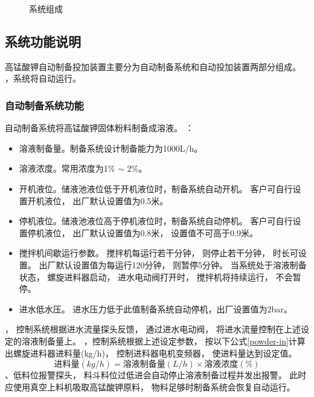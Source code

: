 \documentclass[UTF8,a4paper,12pt,titlepage]{ctexart}
\begin{document}
\begin{figure}[h]
\begin{tikzpicture}

         \end{tikzpicture}
         \caption{系统组成}\label{fig:p2}
      \end{figure}

   \subsection{系统功能说明}
      高锰酸钾自动制备投加装置主要分为自动制备系统和自动投加装置两部分组成。
      ，系统将自动运行。
      \subsubsection{自动制备系统功能}
         自动制备系统将高锰酸钾固体粉料制备成溶液。
         ：
         \begin{itemize}
            \item 溶液制备量。制备系统设计制备能力为1000L/h。
            \item 溶液浓度。常用浓度为1\% $\sim$ 2\%。
            \item 开机液位。储液池液位低于开机液位时，制备系统自动开机。
               客户可自行设置开机液位，
               出厂默认设置值为0.5米。
            \item 停机液位。储液池液位高于停机液位时，制备系统自动停机。
               客户可自行设置停机液位，
               出厂默认设置值为0.8米，
               设置值不可高于0.9米。
            \item 搅拌机间歇运行参数。
            搅拌机每运行若干分钟，
            则停止若干分钟，
            时长可设置。
            出厂默认设置值为每运行120分钟，
            则暂停5分钟。
            当系统处于溶液制备状态，
            螺旋进料器启动，
            进水电动阀打开时，
            搅拌机将持续运行，
            不会暂停。
            \item 进水低水压。
            进水压力低于此值制备系统自动停机，出厂设置值为2bar。
         \end{itemize}
         ，
         控制系统根据进水流量探头反馈，
         通过进水电动阀，
         将进水流量控制在上述设定的溶液制备量上。
         ，控制系统根据上述设定参数，
         按以下公式\ref{powder-in}计算出螺旋进料器进料量(kg/h)，
         控制进料器电机变频器，
         使进料量达到设定值。
         \begin{equation}
            \label{powder-in}
            \mbox{进料量}(kg/h) = \mbox{溶液制备量}(L/h)  \times \mbox{溶液浓度} (\%)
         \end{equation}
         、低料位报警探头，
         料斗料位过低进会自动停止溶液制备过程并发出报警。
         此时应使用真空上料机吸取高锰酸钾原料，
         物料足够时制备系统会恢复自动运行。
\end{document}
